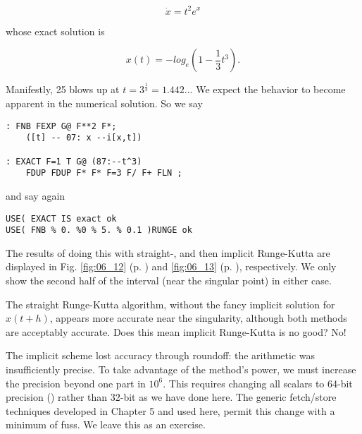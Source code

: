 \begin{equation}
\dot{x} = t^2e^x
\end{equation}

whose exact solution is

\begin{equation}
x(t) = -log_e(1-\frac{1}{3}t^3).
\end{equation}

Manifestly, 25 blows up at $t = 3^\frac{1}{3}=1.442...$ We expect the behavior to become apparent in the numerical solution. So we say

\begin{lstlisting}
: FNB FEXP G@ F**2 F*;
    ([t] -- 07: x --i[x,t])

: EXACT F=1 T G@ (87:--t^3)
    FDUP FDUP F* F* F=3 F/ F+ FLN ;
\end{lstlisting}

and say again
\begin{lstlisting}
USE( EXACT IS exact ok
USE( FNB % 0. %0 % 5. % 0.1 )RUNGE ok
\end{lstlisting}

The results of doing this with straight-, and then implicit Runge-Kutta are
displayed in Fig. \ref{fig:06_12} (p. \pageref{fig:06_12}) and \ref{fig:06_13}
(p. \pageref{fig:06_13}), respectively. We only show the second half of the
interval (near the singular point) in either case.

The straight Runge-Kutta algorithm, without the fancy implicit solution for $x(t +h)$, appears more accurate near the singularity, although both methods are acceptably accurate. Does this mean implicit Runge-Kutta is no good? No!

The implicit scheme lost accuracy through roundoff: the arithmetic was insufficiently precise. To take advantage of the method's power, we must increase the precision beyond one part in $10^{6}$. This requires changing all scalars to 64-bit precision () rather than 32-bit as we have done here. The generic fetch/store techniques developed in Chapter 5 and used here, permit this change with a minimum of fuss. We leave this as an exercise.

